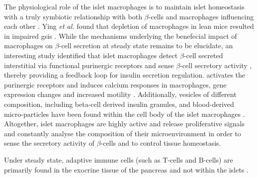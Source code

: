 \par The physiological role of the islet macrophages is to maintain islet homeostasis with a truly symbiotic relationship with both $\beta$-cells and macrophages influencing each other \textbf{\cite{unanue_macrophages_2016}}. Ying \textit{et al.} found that depletion of macrophages in lean mice resulted in impaired \gls{gsis} \textbf{\cite{ying_expansion_2019}}. While the mechanisms underlying the benefecial impact of macrophages on $\beta$-cell secretion at steady state remains to be elucidate, an interesting study identified  that islet macrophages %
detect $\beta$-cell secreted interstitial  via functional purinergic receptors and sense $\beta$-cell secretory activity \textbf{\cite{weitz_mouse_2018}}, thereby providing a feedback loop for insulin secretion regulation.  activates the purinergic receptors and induces calcium responses in macrophages, gene expression changes and increased motility \textbf{\cite{cosentino_crosstalk_2021}}. Additionally, vesicles of different composition, including beta-cell derived insulin granules, and blood-derived micro-particles have been found within the cell body of the islet macrophages \textbf{\cite{vomund_beta_2015,zinselmeyer_resident_2018}}. Altogether, islet macrophages are highly active and release proliferative signals and constantly analyse the composition of their microenvironment in order to sense the secretory activity of $\beta$-cells and to control tissue homeostasis.\\


\par Under steady state, adaptive immune cells (such as T-cells and B-cells) are primarily found in the exocrine tissue of the pancreas and not within the islets \textbf{\cite{calderon_pancreas_2015, ying_expansion_2019}}.


% 






